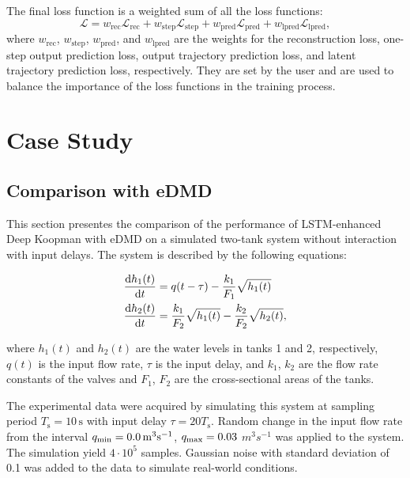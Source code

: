 \documentclass[conference]{IEEEtran}
\newcommand{\ui}[2]{#1_{\text{#2}}}  %
\begin{document}
The final loss function is a weighted sum of all the loss functions:
\begin{equation}
    \mathcal{L} = \ui{w}{rec}\mathcal{L}_{\text{rec}} + \ui{w}{step}\mathcal{L}_{\text{step}} + \ui{w}{pred}\mathcal{L}_{\text{pred}} + \ui{w}{lpred}\mathcal{L}_{\text{lpred}},
\end{equation}
where \(\ui{w}{rec}\), \(\ui{w}{step}\), \(\ui{w}{pred}\), and \(\ui{w}{lpred}\) are the weights for the reconstruction loss, one-step output prediction loss, output trajectory prediction loss, and latent trajectory prediction loss, respectively. They are set by the user and are used to balance the importance of the loss functions in the training process.

\section{Case Study}\label{sec:results}

\subsection{Comparison with eDMD}\label{subsec:results:comparison_edmd}

This section presentes the comparison of the performance of LSTM-enhanced Deep Koopman with eDMD on a simulated two-tank system without interaction with input delays. The system is described by the following equations:

\begin{equation}
    \begin{aligned}
        \diff{h_1(t)}{t} & = q(t-\tau) - \frac{k_1}{F_1}\sqrt{h_1(t)}                     \\
        \diff{h_2(t)}{t} & = \frac{k_1}{F_2}\sqrt{h_1(t)} - \frac{k_2}{F_2}\sqrt{h_2(t)},
    \end{aligned}
\end{equation}

where \(h_1(t)\) and \(h_2(t)\) are the water levels in tanks 1 and 2, respectively, \(q(t)\) is the input flow rate, \(\tau \) is the input delay, and \(k_1\), \(k_2\) are the flow rate constants of the valves and \(F_1\), \(F_2\) are the cross-sectional areas of the tanks.

The experimental data were acquired by simulating this system at sampling period \( \ui{T}{s} = 10 \, \mathrm{s} \) with input delay \( \tau = 20\ui{T}{s} \). Random change in the input flow rate from the interval \( \ui{q}{\text{min}} = 0.0 \, \unit{m^3s^{-1}} \), \( \ui{q}{\text{max}} = 0.03 \) \( \unit{m^3s^{-1}} \) was applied to the system. The simulation yield \( 4 \cdot 10^5\) samples. Gaussian noise with standard deviation of 0.1 was added to the data to simulate real-world conditions.
\end{document}
